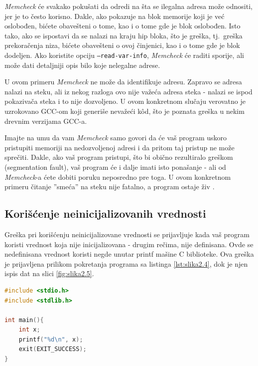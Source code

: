 \documentclass[12pt,oneside]{memoir}
\theoremstyle{plain}
\theoremstyle{definition}
\begin{document}
\textit{Memcheck} će svakako pokušati da odredi na šta se ilegalna adresa može odnositi, jer je to često korisno. Dakle, ako pokazuje na blok memorije koji je već oslobođen, bićete obavešteni o tome, kao i o tome gde je blok oslobođen. Isto tako, ako se ispostavi da se nalazi na kraju hip bloka, što je greška, tj.~greška prekoračenja niza, bićete obavešteni o ovoj činjenici, kao i o tome gde je blok dodeljen. Ako koristite opciju \texttt{--read-var-info}, \textit{Memcheck} će raditi sporije, ali može dati detaljniji opis bilo koje nelegalne adrese.

U ovom primeru \textit{Memcheck} ne može da identifikuje adresu. Zapravo se adresa nalazi na steku, ali iz nekog razloga ovo nije važeća adresa steka - nalazi se ispod pokazivača steka i to nije dozvoljeno. U ovom konkretnom slučaju verovatno je uzrokovano GCC-om koji generiše nevažeći k\^od, što je poznata greška u nekim drevnim verzijama GCC-a.

Imajte na umu da vam \textit{Memcheck} samo govori da će vaš program uskoro pristupiti memoriji na nedozvoljenoj adresi i da pritom taj pristup ne može sprečiti. Dakle, ako vaš program pristupi, što bi obično rezultiralo greškom (segmentation fault), vaš program će i dalje imati isto ponašanje - ali od \textit{Memcheck}-a ćete dobiti poruku neposredno pre toga. U ovom konkretnom primeru čitanje ''smeća'' na steku nije fatalno, a program ostaje živ \cite{Memcheck}. 

\subsection{Korišćenje neinicijalizovanih vrednosti}
Greška pri korišćenju neinicijalizovane vrednosti se prijavljuje kada vaš program koristi vrednost koja nije inicijalizovana - drugim rečima, nije definisana. Ovde se nedefinisana vrednost koristi negde unutar printf mašine C biblioteke. Ova greška je prijavljena prilikom pokretanja programa sa listinga \ref{lst:slika2.4}, dok je njen ispis dat na slici \ref{fig:slika2.5}.

\begin{lstlisting}[caption={Program koji izaziva grešku korišćenja neinicijalizovanih vrednosti}, label={lst:slika2.4},language={C}] 
#include <stdio.h>
#include <stdlib.h>

int main(){
	int x;
	printf("%d\n", x);
	exit(EXIT_SUCCESS);
}
\end{lstlisting}

\end{document}

